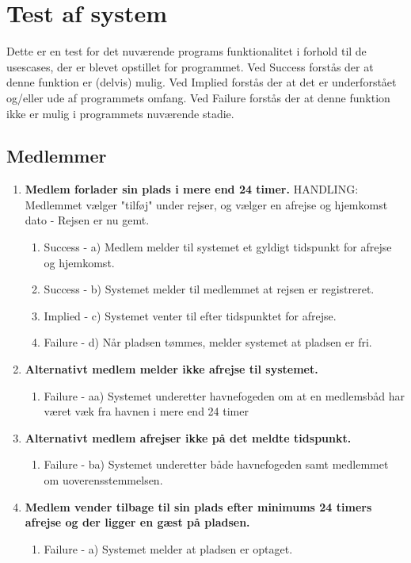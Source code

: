 
\section{Test af system}
Dette er en test for det nuværende programs funktionalitet i forhold til de usescases, der er blevet opstillet for programmet.
Ved Success forstås der at denne funktion er (delvis) mulig.
Ved Implied forstås der at det er underforstået og/eller ude af programmets omfang.
Ved Failure forstås der at denne funktion ikke er mulig i programmets nuværende stadie.
\subsection{Medlemmer}
\begin{enumerate}
	\item{\bf{Medlem forlader sin plads i mere end 24 timer.}}
		HANDLING: Medlemmet vælger "tilføj" under rejser, og vælger en afrejse og hjemkomst dato - Rejsen er nu gemt.
	  \begin{enumerate}
			\item Success -  a) Medlem melder til systemet et gyldigt tidspunkt for afrejse og hjemkomst.
			\item Success -  b) Systemet melder til medlemmet at rejsen er registreret. 
			\item Implied -  c) Systemet venter til efter tidspunktet for afrejse.
			\item Failure -  d) Når pladsen tømmes, melder systemet at pladsen er fri.
	   \end{enumerate}
			
	\item{\bf{Alternativt medlem melder ikke afrejse til systemet.}}
	  \begin{enumerate}
			\item Failure -  aa) Systemet underetter havnefogeden om at en medlemsbåd har været væk fra havnen i mere end 24 timer
	   \end{enumerate}
	   
	\item{\bf{Alternativt medlem afrejser ikke på det meldte tidspunkt.}}
	  \begin{enumerate}
			\item Failure -  ba) Systemet underetter både havnefogeden samt medlemmet om uoverensstemmelsen.
	   \end{enumerate}
	   
	\item{\bf{Medlem vender tilbage til sin plads efter minimums 24 timers afrejse og der ligger en gæst på pladsen.}}
	  \begin{enumerate}
			\item Failure -  a) Systemet melder at pladsen er optaget.
	   \end{enumerate}
	   

\end{enumerate}
